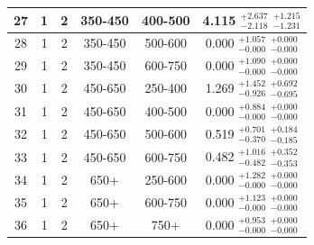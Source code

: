 \begin{table}[htbp]
\begin{centering}
\begin{tabular}{|c|c|c|c|c||c|}
\hline
27 &               1 &               2 &         350-450 &         400-500 & 4.115 $^{+2.637}_{-2.118}$ $^{+1.215}_{-1.231}$ \\ 
\hline
28 &               1 &               2 &         350-450 &         500-600 & 0.000 $^{+1.057}_{-0.000}$ $^{+0.000}_{-0.000}$ \\ 
\hline
29 &               1 &               2 &         350-450 &         600-750 & 0.000 $^{+1.090}_{-0.000}$ $^{+0.000}_{-0.000}$ \\ 
\hline
30 &               1 &               2 &         450-650 &         250-400 & 1.269 $^{+1.452}_{-0.926}$ $^{+0.692}_{-0.695}$ \\ 
\hline
31 &               1 &               2 &         450-650 &         400-500 & 0.000 $^{+0.884}_{-0.000}$ $^{+0.000}_{-0.000}$ \\ 
\hline
32 &               1 &               2 &         450-650 &         500-600 & 0.519 $^{+0.701}_{-0.370}$ $^{+0.184}_{-0.185}$ \\ 
\hline
33 &               1 &               2 &         450-650 &         600-750 & 0.482 $^{+1.016}_{-0.482}$ $^{+0.352}_{-0.353}$ \\ 
\hline
34 &               1 &               2 &            650+ &         250-600 & 0.000 $^{+1.282}_{-0.000}$ $^{+0.000}_{-0.000}$ \\ 
\hline
35 &               1 &               2 &            650+ &         600-750 & 0.000 $^{+1.123}_{-0.000}$ $^{+0.000}_{-0.000}$ \\ 
\hline
36 &               1 &               2 &            650+ &            750+ & 0.000 $^{+0.953}_{-0.000}$ $^{+0.000}_{-0.000}$ \\ 
\hline
\end{tabular}
\par\end{centering}
\end{table}


